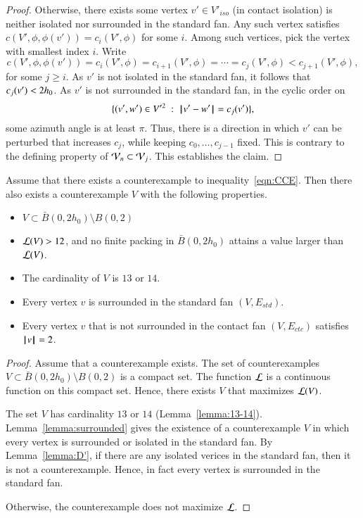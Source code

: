 \begin{proof}
 Otherwise,
there exists some vertex $v'\in V'_{iso}$ (in contact isolation)
is neither isolated nor surrounded in the standard fan.  
Any such vertex satisfies $c(V',\phi,\phi(v'))=c_i(V',\phi)$ for some $i$.
Among such vertices, pick the vertex with smallest index
$i$.  Write 
$$
c(V',\phi,\phi(v')) = c_i(V',\phi) = c_{i+1}(V',\phi) =\cdots= c_j(V',\phi) < c_{j+1}(V',\phi),
$$
for some $j\ge i$.  As $v'$ is not isolated in the
standard fan, it follows that $c_j(v') < 2{h_0}$.  As $v'$ is not surrounded in the standard fan,
in the cyclic order on
$$
\{(v',w')\in V'^2 \ :\  {\hskip0.1em|\hskip-0.15em|\hskip0.1em}v' - w'{\hskip0.1em|\hskip-0.15em|\hskip0.1em} = c_j(v')\},
$$
some azimuth angle is at least $\pi$.
Thus, there is a direction in which $v'$ can be perturbed
that increases $c_j$, while keeping $c_0,\ldots,c_{j-1}$
fixed.  This is contrary to the defining property of
${\mathcal V}_n\subset{\mathcal V}_j$.  This establishes the claim.
%
\end{proof}



\begin{lemma}\label{lemma:CE} 
Assume that there exists a counterexample to inequality~\ref{eqn:CCE}.  Then there also exists a counterexample $V$ with the following properties.
\begin{itemize}
\item $V\subset \bar B(0,2h_0)\setminus B(0,2)$
\item ${\mathcal L}(V) > 12$, and no finite packing in $\bar B(0,2h_0)$ attains a value larger than ${\mathcal L}(V)$.
\item The cardinality of $V$ is $13$ or $14$.
\item Every vertex $v$ is surrounded in the standard fan $(V,E_{std})$.
\item Every vertex $v$ that is not surrounded in the contact
fan $(V,E_{ctc})$ satisfies ${{\hskip0.1em|\hskip-0.15em|\hskip0.1em}v{\hskip0.1em|\hskip-0.15em|\hskip0.1em}}=2$.
\end{itemize}
\end{lemma}

\begin{proof}  Assume that a counterexample exists.
The set of counterexamples $V\subset\bar B(0,2h_0)\setminus B(0,2)$ is a compact set.  The function ${\mathcal L}$ is a continuous function on this compact set.  Hence, there exists $V$ that maximizes ${\mathcal L}(V)$.

The set $V$ has cardinality $13$ or $14$ (Lemma~\ref{lemma:13-14}). Lemma~\ref{lemma:surrounded} gives the existence of a counterexample $V$ in which every vertex is surrounded or isolated in the standard fan.  By Lemma~\ref{lemma:D'}, if there are any isolated verices in the standard fan, then it is not a counterexample.  Hence, in fact every vertex is surrounded in the standard fan.  

  Otherwise, the counterexample does not maximize ${\mathcal L}$.
%
\end{proof}


